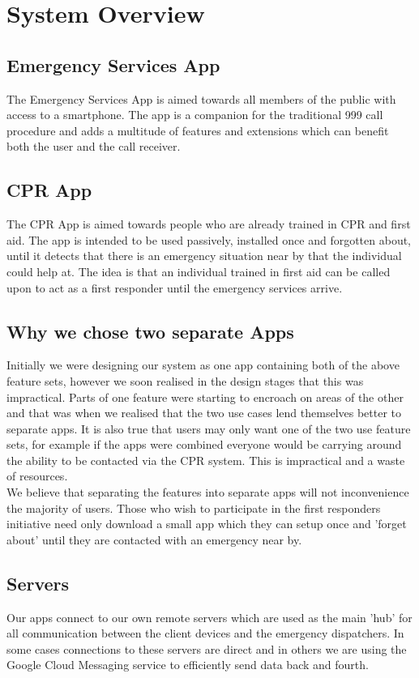 \documentclass{article}
\begin{document}
\pagebreak
    \section{System Overview}
    \subsection{Emergency Services App}
    The Emergency Services App is aimed towards all members of the public with access to a smartphone. The app is a companion for the traditional 999 call procedure and adds a multitude of features and extensions which can benefit both the user and the call receiver.
    \subsection{CPR App}
    The CPR App is aimed towards people who are already trained in CPR and first aid. The app is intended to be used passively, installed once and forgotten about, until it detects that there is an emergency situation near by that the individual could help at. The idea is that an individual trained in first aid can be called upon to act as a first responder until the emergency services arrive.
    \subsection{Why we chose two separate Apps}
    Initially we were designing our system as one app containing both of the above feature sets, however we soon realised in the design stages that this was impractical. Parts of one feature were starting to encroach on areas of the other and that was when we realised that the two use cases lend themselves better to separate apps. It is also true that users may only want one of the two use feature sets, for example if the apps were combined everyone would be carrying around the ability to be contacted  via the CPR system. This is impractical and a waste of resources.\\
    
    We believe that separating the features into separate apps will not inconvenience the majority of users. Those who wish to participate in the first responders initiative need only download a small app which they can setup once and 'forget about' until they are contacted with an emergency near by.
    \subsection{Servers}
    Our apps connect to our own remote servers which are used as the main 'hub' for all communication between the client devices and the emergency dispatchers. In some cases connections to these servers are direct and in others we are using the Google Cloud Messaging service to efficiently send data back and fourth.
\end{document}
